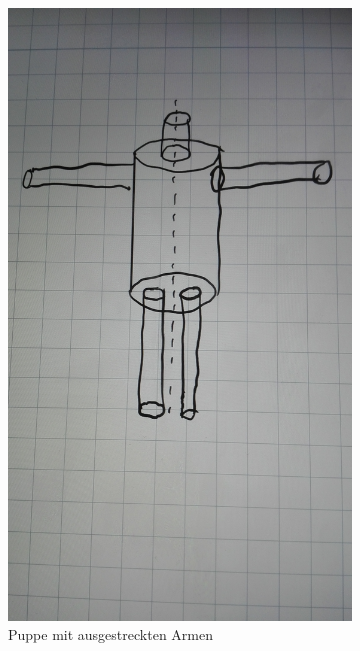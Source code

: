 \begin{figure}[H]
\caption{Positionen der Puppe}
\begin{subfigure}{0.495\linewidth}
\centering
\includegraphics[width=\textwidth]{images/puppe_aus.jpg}
\caption{Puppe mit ausgestreckten Armen}
\end{subfigure}
\begin{subfigure}{0.495\linewidth}
\centering

\end{subfigure}
\end{figure}
